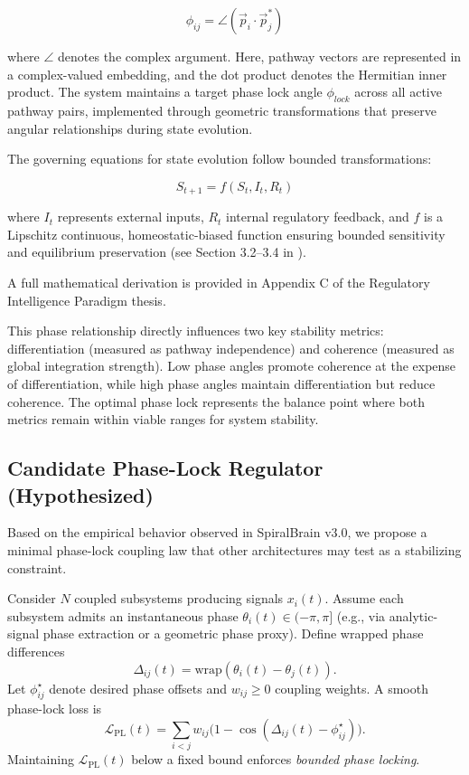 \documentclass[12pt,a4paper]{article}
\begin{document}
\[\phi_{ij} = \angle(\vec{p}_i \cdot \vec{p}_j^*)\]

where $\angle$ denotes the complex argument. Here, pathway vectors are represented in a complex-valued embedding, and the dot product denotes the Hermitian inner product. The system maintains a target phase lock angle $\phi_{lock}$ across all active pathway pairs, implemented through geometric transformations that preserve angular relationships during state evolution.

The governing equations for state evolution follow bounded transformations:

\[S_{t+1} = f(S_t, I_t, R_t)\]

where $I_t$ represents external inputs, $R_t$ internal regulatory feedback, and $f$ is a Lipschitz continuous, homeostatic-biased function ensuring bounded sensitivity and equilibrium preservation (see Section 3.2–3.4 in \cite{Cragin2026RI}).

A full mathematical derivation is provided in Appendix C of the Regulatory Intelligence Paradigm thesis.

This phase relationship directly influences two key stability metrics: differentiation (measured as pathway independence) and coherence (measured as global integration strength). Low phase angles promote coherence at the expense of differentiation, while high phase angles maintain differentiation but reduce coherence. The optimal phase lock represents the balance point where both metrics remain within viable ranges for system stability.

\subsection{Candidate Phase-Lock Regulator (Hypothesized)}

Based on the empirical behavior observed in SpiralBrain v3.0, we propose a minimal
phase-lock coupling law that other architectures may test as a stabilizing constraint.

Consider $N$ coupled subsystems producing signals $x_i(t)$. Assume each subsystem admits
an instantaneous phase $\theta_i(t)\in(-\pi,\pi]$ (e.g., via analytic-signal phase extraction
or a geometric phase proxy). Define wrapped phase differences
\[
\Delta_{ij}(t)=\mathrm{wrap}(\theta_i(t)-\theta_j(t)).
\]
Let $\phi_{ij}^\star$ denote desired phase offsets and $w_{ij}\ge 0$ coupling weights.
A smooth phase-lock loss is
\[
\mathcal{L}_{\mathrm{PL}}(t)=\sum_{i<j} w_{ij}\Big(1-\cos(\Delta_{ij}(t)-\phi^\star_{ij})\Big).
\]
Maintaining $\mathcal{L}_{\mathrm{PL}}(t)$ below a fixed bound enforces \emph{bounded phase locking}.
\end{document}
